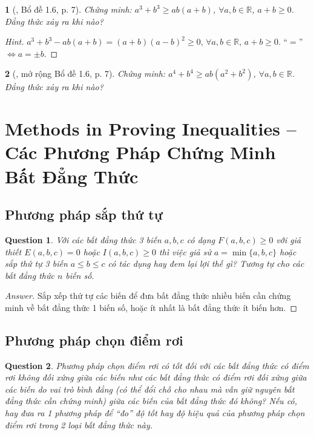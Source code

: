 \documentclass{article}
\newtheorem{baitoan}{}
\newtheorem{question}{Question}
\begin{document}
\begin{baitoan}[\cite{Son_Nghiep_Trung_Can_bdt}, Bổ đề 1.6, p. 7]
	Chứng minh: $a^3 + b^3\ge ab(a + b)$, $\forall a,b\in\mathbb{R}$, $a + b\ge 0$. Đẳng thức xảy ra khi nào?
\end{baitoan}

\begin{proof}[Hint]
	$a^3 + b^3 - ab(a + b) = (a + b)(a - b)^2\ge 0$, $\forall a,b\in\mathbb{R}$, $a + b\ge 0$. ``$=$'' $\Leftrightarrow a = \pm b$.
\end{proof}

\begin{baitoan}[\cite{Son_Nghiep_Trung_Can_bdt}, mở rộng Bổ đề 1.6, p. 7]
	Chứng minh: $a^4 + b^4\ge ab(a^2 + b^2)$, $\forall a,b\in\mathbb{R}$. Đẳng thức xảy ra khi nào?
\end{baitoan}


\section{Methods in Proving Inequalities -- Các Phương Pháp Chứng Minh Bất Đẳng Thức}

\subsection{Phương pháp sắp thứ tự}

\begin{question}
	Với các bất đẳng thức 3 biến $a,b,c$ có dạng $F(a,b,c)\ge0$ với giả thiết $E(a,b,c) = 0$ hoặc $I(a,b,c)\ge0$ thì việc giả sử $a = \min\{a,b,c\}$ hoặc sắp thứ tự 3 biến $a\le b\le c$ có tác dụng hay đem lại lợi thế gì? Tương tự cho các bất đẳng thức $n$ biến số.
\end{question}

\begin{proof}[Answer]
	Sắp xếp thứ tự các biến để đưa bất đẳng thức nhiều biến cần chứng minh về bất đẳng thức 1 biến số, hoặc ít nhất là bất đẳng thức ít biến hơn.
\end{proof}

\subsection{Phương pháp chọn điểm rơi}

\begin{question}
	Phương pháp chọn điểm rơi có tốt đối với các bất đẳng thức có điểm rơi không đối xứng giữa các biến như các bất đẳng thức có điểm rơi đối xứng giữa các biến do vai trò bình đẳng (có thể đổi chỗ cho nhau mà vẫn giữ nguyên bất đẳng thức cần chứng minh) giữa các biến của bất đẳng thức đó không? Nếu có, hay đưa ra 1 phương pháp để ``đo'' độ tốt hay độ hiệu quả của phương pháp chọn điểm rơi trong 2 loại bất đẳng thức này.
\end{question}
\end{document}
